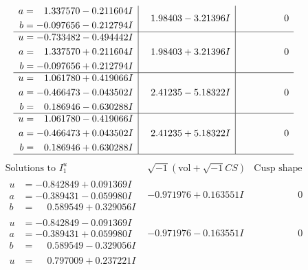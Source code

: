 \documentclass[1p]{elsarticle_modified}
\theoremstyle{definition}
\newcommand{\I}{\sqrt{-1}}
\begin{document}
$$\begin{array}{c|c|c}
\begin{aligned}
a &= \phantom{-}1.337570 - 0.211604 I \\
b &= -0.097656 - 0.212794 I\end{aligned}
 & \phantom{-}1.98403 - 3.21396 I & \phantom{-0.000000 } 0 \\ \hline\begin{aligned}
u &= -0.733482 - 0.494442 I \\
a &= \phantom{-}1.337570 + 0.211604 I \\
b &= -0.097656 + 0.212794 I\end{aligned}
 & \phantom{-}1.98403 + 3.21396 I & \phantom{-0.000000 } 0 \\ \hline\begin{aligned}
u &= \phantom{-}1.061780 + 0.419066 I \\
a &= -0.466473 - 0.043502 I \\
b &= \phantom{-}0.186946 - 0.630288 I\end{aligned}
 & \phantom{-}2.41235 - 5.18322 I & \phantom{-0.000000 } 0 \\ \hline\begin{aligned}
u &= \phantom{-}1.061780 - 0.419066 I \\
a &= -0.466473 + 0.043502 I \\
b &= \phantom{-}0.186946 + 0.630288 I\end{aligned}
 & \phantom{-}2.41235 + 5.18322 I & \phantom{-0.000000 } 0\\
 \hline 
 \end{array}$$\newpage$$\begin{array}{c|c|c}  
\text{Solutions to }I^u_{1}& \I (\text{vol} + \sqrt{-1}CS) & \text{Cusp shape}\\
 \hline 
\begin{aligned}
u &= -0.842849 + 0.091369 I \\
a &= -0.389431 - 0.059980 I \\
b &= \phantom{-}0.589549 + 0.329056 I\end{aligned}
 & -0.971976 + 0.163551 I & \phantom{-0.000000 } 0 \\ \hline\begin{aligned}
u &= -0.842849 - 0.091369 I \\
a &= -0.389431 + 0.059980 I \\
b &= \phantom{-}0.589549 - 0.329056 I\end{aligned}
 & -0.971976 - 0.163551 I & \phantom{-0.000000 } 0 \\ \hline\begin{aligned}
u &= \phantom{-}0.797009 + 0.237221 I \\

\end{aligned}
\end{array}$$
\end{document}
